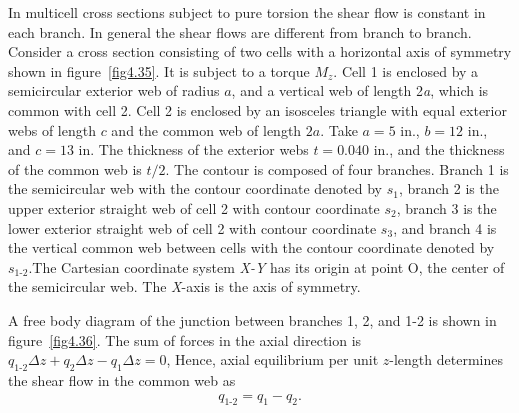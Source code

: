 \documentclass{AeroStructure-ERJohnson}
\begin{document}
\begin{example*}\label{ex4.10}In multicell cross sections subject to pure torsion the shear flow is constant in each branch. In general the shear flows are different from branch to branch. Consider a cross section consisting of two cells with a horizontal axis of symmetry shown in figure~\ref{fig4.35}. It is subject to a torque ${M}_z$. Cell 1 is enclosed by a semicircular exterior web of radius $a$, and a vertical web of length 2\textit{a}, which is common with cell 2. Cell 2 is enclosed by an isosceles triangle with equal exterior webs of length $c$ and the common web of length $2a$. Take $a = 5$ in., $b = 12$ in., and $c = 13$ in. The thickness of the exterior webs $t = 0.040$ in., and the thickness of the common web is $t/2$. The contour is composed of four branches. Branch 1 is the semicircular web with the contour coordinate denoted by $s_1$, branch 2 is the upper exterior straight web of cell 2 with contour coordinate $s_2$, branch 3 is the lower exterior straight web of cell 2 with contour coordinate $s_3$, and branch 4 is the vertical common web between cells with the contour coordinate denoted by $s_{\textrm{1-2}}$.The Cartesian coordinate system \textit{X-Y} has its origin at point O, the center of the semicircular web. The \textit{X}-axis is the axis of symmetry.

\pagebreak

{\def\thefigure{4.35}
}



A free body diagram of the junction between branches 1, 2, and 1-2 is shown in figure~\ref{fig4.36}. The sum of forces in the axial direction is $q_{\textrm{1-2}} \Delta z+q_{2} \Delta z-q_{1} \Delta z=0$, Hence, axial equilibrium per unit $z$-length determines the shear flow in the common web as
\begin{align}\label{ex4.10a}
q_{\textrm{1-2}}=q_{1}-q_{2}.\tag{a}
\end{align}


\end{example*}
\end{document}
